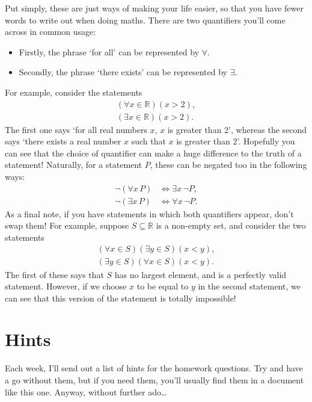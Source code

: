 \documentclass[
  12pt,
  a4paper]{extarticle}
\providecommand{\tightlist}{%
  \setlength{\itemsep}{0pt}\setlength{\parskip}{0pt}}
\theoremstyle{plain}
\theoremstyle{definition}
\theoremstyle{plain}
\theoremstyle{plain}
\theoremstyle{plain}
\theoremstyle{plain}
\theoremstyle{definition}
\theoremstyle{definition}
\newtheorem*{Order Axioms*}{Order Axioms}\newtheorem{Order Axioms}{Order Axioms}[section]
\theoremstyle{remark}
\theoremstyle{remark}
\renewcommand{\;}{\,}
\begin{document}
Put simply, these are just ways of making your life easier, so that you have fewer words to write out when doing maths. There are two quantifiers you'll come across in common usage:

\begin{itemize}
\tightlist
\item
  Firstly, the phrase `for all' can be represented by \(\forall\).
\item
  Secondly, the phrase `there exists' can be represented by \(\exists\).
\end{itemize}

For example, consider the statements
\begin{align*}
    (\forall x \in \mathbb{R})(x > 2),\\
    (\exists x \in \mathbb{R})(x > 2).
\end{align*}
The first one says `for all real numbers \(x\), \(x\) is greater than 2', whereas the second says `there exists a real number \(x\) such that \(x\) is greater than 2'. Hopefully you can see that the choice of quantifier can make a huge difference to the truth of a statement! Naturally, for a statement \(P\), these can be negated too in the following ways:
\begin{align*}
    \neg(\forall x \; P) &\Leftrightarrow \exists x \; \neg P,\\
    \neg(\exists x \; P) &\Leftrightarrow \forall x\;  \neg P.
\end{align*}
As a final note, if you have statements in which both quantifiers appear, don't swap them! For example, suppose \(S \subseteq \mathbb{R}\) is a non-empty set, and consider the two statements
\begin{align*}
    (\forall x \in S)(\exists y \in S)(x < y),\\
    (\exists y \in S)(\forall x \in S)(x < y).
\end{align*}
The first of these says that \(S\) has no largest element, and is a perfectly valid statement. However, if we choose \(x\) to be equal to \(y\) in the second statement, we can see that this version of the statement is totally impossible!

\hypertarget{hints}{%
\section{Hints}\label{hints}}

Each week, I'll send out a list of hints for the homework questions. Try and have a go without them, but if you need them, you'll usually find them in a document like this one. Anyway, without further ado\ldots{}
\end{document}
